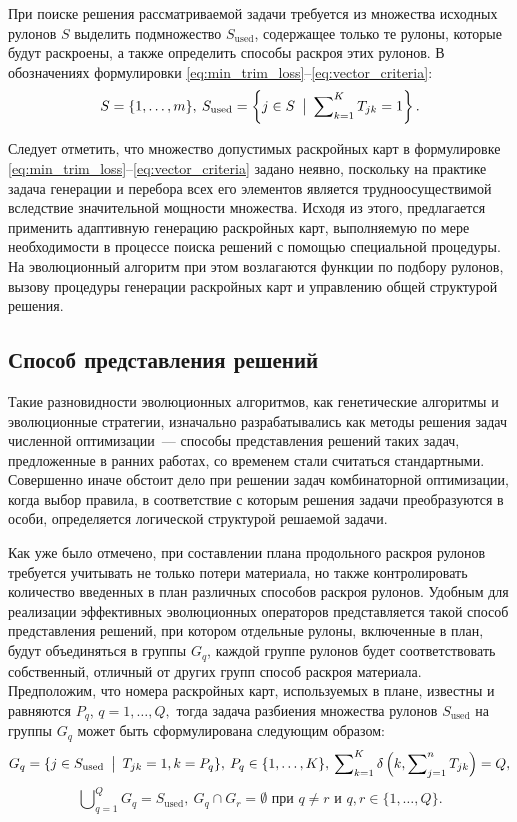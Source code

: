 \documentclass[12pt]{article}
\begin{document}
При поиске решения рассматриваемой задачи требуется из множества исходных 
рулонов $S$ выделить подмножество $S_{\text{used}}$, содержащее только те 
рулоны, которые будут раскроены, а также определить способы раскроя этих 
рулонов. В обозначениях формулировки 
\eqref{eq:min_trim_loss}--\eqref{eq:vector_criteria}:
\[ S=\{1,\ldots,m\},\: 
   S_{\text{used}}=\left\{ j \in S \: \bigm| \: \sum\nolimits_{k=1}^{K} T_{jk}=1 \right\}. \]

Следует отметить, что множество допустимых раскройных карт в формулировке 
\eqref{eq:min_trim_loss}--\eqref{eq:vector_criteria} 
задано неявно, поскольку на практике задача генерации и перебора всех 
его элементов является трудноосуществимой вследствие значительной мощности 
множества. Исходя из этого, предлагается применить адаптивную генерацию 
раскройных карт, выполняемую по мере необходимости в процессе поиска решений 
с помощью специальной процедуры. На эволюционный алгоритм при этом возлагаются 
функции по подбору рулонов, вызову процедуры генерации раскройных карт и 
управлению общей структурой решения.

\subsection{Способ представления решений}

Такие разновидности эволюционных алгоритмов, как генетические алгоритмы и 
эволюционные стратегии, изначально разрабатывались как методы решения задач 
численной оптимизации~--- способы представления решений таких задач, 
предложенные в ранних работах, со временем стали считаться стандартными. 
Совершенно иначе обстоит дело при решении задач комбинаторной оптимизации, 
когда выбор правила, в соответствие с которым решения задачи преобразуются в 
особи, определяется логической структурой решаемой задачи.

Как уже было отмечено, при составлении плана продольного раскроя рулонов 
требуется учитывать не только потери материала, но также контролировать 
количество введенных в план различных способов раскроя рулонов. Удобным для 
реализации эффективных эволюционных операторов представляется такой способ 
представления решений, при котором отдельные рулоны, включенные в план, 
будут объединяться в группы $G_q$, каждой группе рулонов будет соответствовать 
собственный, отличный от других групп способ раскроя материала. Предположим, 
что номера раскройных карт, используемых в плане, известны и равняются $P_q$, 
$q=1,\ldots,Q,$ тогда задача разбиения множества рулонов $S_{\text{used}}$ 
на группы $G_q$ может быть сформулирована следующим образом:
\[ G_q=\{ j \in S_{\text{used}} \: \bigm| \: T_{jk}=1,k=P_q \}, \: 
   P_q \in \{1,\ldots,K\}, \: 
   \sum\nolimits_{k=1}^{K} \delta\left(k, \sum\nolimits_{j=1}^{n} T_{jk}\right)=Q, \]
\[ \bigcup\nolimits_{q=1}^{Q}G_q=S_{\text{used}}, \: 
   G_q \cap G_r=\emptyset \text{ при } q \neq r \text{ и } q,r \in \{1,\ldots,Q\}.
\]
\end{document}
